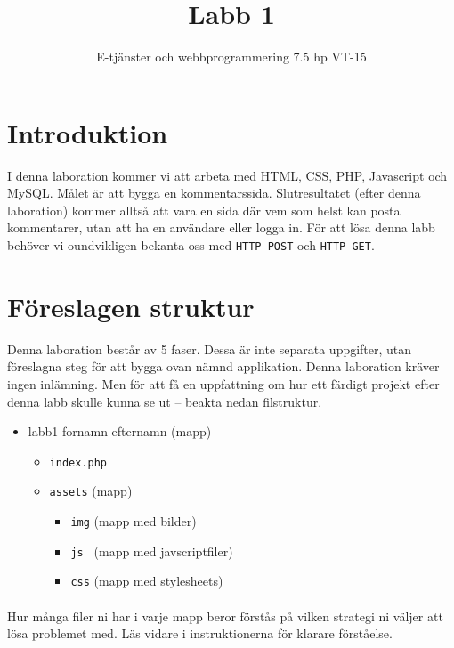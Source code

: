 \documentclass[12pt]{article}
\date{}
\title{ Labb 1 }
\author{ E-tjänster och webbprogrammering 7.5 hp VT-15 }
\begin{document}
\maketitle
\vspace{-2em}



\section{Introduktion}
I denna laboration kommer vi att arbeta med HTML, CSS, PHP, Javascript och MySQL. Målet är att bygga en kommentarssida. Slutresultatet (efter denna laboration) kommer alltså att vara en sida där vem som helst kan posta kommentarer, utan att ha en användare eller logga in. För att lösa denna labb behöver vi oundvikligen bekanta oss med \texttt{HTTP POST} och \texttt{HTTP GET}.


\section{Föreslagen struktur}
Denna laboration består av 5 faser. Dessa är inte separata uppgifter, utan föreslagna steg för att bygga ovan nämnd applikation. Denna laboration kräver ingen inlämning. Men för att få en uppfattning om hur ett färdigt projekt efter denna labb skulle kunna se ut -- beakta nedan filstruktur.
  \begin{itemize}
    \item labb1-fornamn-efternamn (mapp)
    \begin{itemize}
      \item \texttt{index.php} 
      \item \texttt{assets} (mapp)
      \begin{itemize}
        \item \texttt{img} (mapp med bilder)
        \item \texttt{js  } (mapp med javscriptfiler)
        \item \texttt{css} (mapp med stylesheets)
      \end{itemize}
    \end{itemize}
  \end{itemize}

\paragraph{}
Hur många filer ni har i varje mapp beror förstås på vilken strategi ni väljer att lösa problemet med. Läs vidare i instruktionerna för klarare förståelse.
\end{document}
